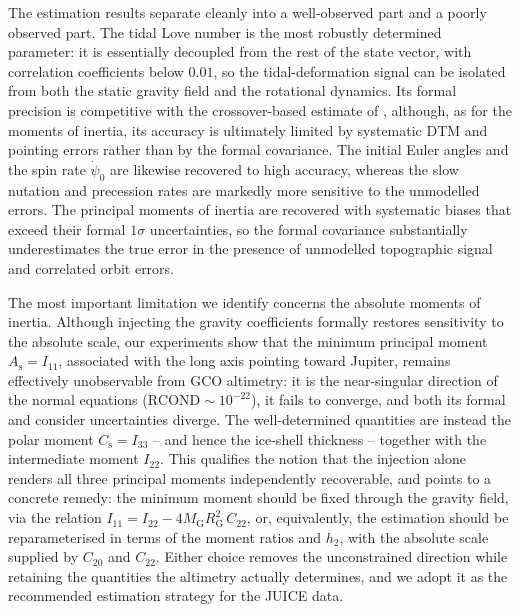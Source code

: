 \documentclass[lineno, pdflatex,sn-mathphys-ay]{sn-jnl}
\theoremstyle{thmstyleone}%
\theoremstyle{thmstyletwo}%
\theoremstyle{thmstylethree}%
\begin{document}
The estimation results separate cleanly into a well-observed part and a poorly observed part. The tidal Love number is the most robustly determined parameter: it is essentially decoupled from the rest of the state vector, with correlation coefficients below $0.01$, so the tidal-deformation signal can be isolated from both the static gravity field and the rotational dynamics. Its formal precision is competitive with the crossover-based estimate of \citet{2015P&SS..117..184S}, although, as for the moments of inertia, its accuracy is ultimately limited by systematic DTM and pointing errors rather than by the formal covariance. The initial Euler angles and the spin rate $\dot{\psi}_0$ are likewise recovered to high accuracy, whereas the slow nutation and precession rates are markedly more sensitive to the unmodelled errors. The principal moments of inertia are recovered with systematic biases that exceed their formal $1\sigma$ uncertainties, so the formal covariance substantially underestimates the true error in the presence of unmodelled topographic signal and correlated orbit errors.

The most important limitation we identify concerns the absolute moments of inertia. Although injecting the gravity coefficients formally restores sensitivity to the absolute scale, our experiments show that the minimum principal moment $A_{\mathrm{s}} = I_{11}$, associated with the long axis pointing toward Jupiter, remains effectively unobservable from GCO altimetry: it is the near-singular direction of the normal equations ($\mathrm{RCOND}\sim 10^{-22}$), it fails to converge, and both its formal and consider uncertainties diverge. The well-determined quantities are instead the polar moment $C_{\mathrm{s}} = I_{33}$ -- and hence the ice-shell thickness -- together with the intermediate moment $I_{22}$. This qualifies the notion that the injection alone renders all three principal moments independently recoverable, and points to a concrete remedy: the minimum moment should be fixed through the gravity field, via the relation $I_{11} = I_{22} - 4 {M}_{\mathrm{G}} R_{\mathrm{G}}^2\,C_{22}$, or, equivalently, the estimation should be reparameterised in terms of the moment ratios and $h_2$, with the absolute scale supplied by $C_{20}$ and $C_{22}$. Either choice removes the unconstrained direction while retaining the quantities the altimetry actually determines, and we adopt it as the recommended estimation strategy for the JUICE data.
\end{document}
